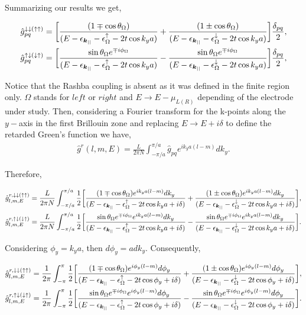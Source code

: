 \documentclass[10pt,prb,showpacs,amssymb,floatfix]{revtex4-1}
\newcommand{\dna}{\downarrow}
\newcommand{\raw}{\rightarrow}
\newcommand{\upa}{\uparrow}
\newcommand{\dlt}{\delta}
\newcommand{\eps}{\epsilon}
\newcommand{\Og}{\Omega}
\begin{document}
Summarizing our results we get,

\begin{align}
\hat{g}^{\dna\dna (\upa\upa)}_{pq} &=\bigg{[}   \frac{(1\mp\cos\theta_\Og)}{(E-\eps_{\bm{k}_{||}}- \eps_\Og^\upa   -2t\cos k_ya)}+ \frac{(1\pm\cos\theta_\Og)}{(E-\eps_{\bm{k}_{||}}- \eps_\Og^\dna   -2t\cos k_ya)} \bigg{]}\frac{\dlt_{pq}}{2},  \\
\hat{g}^{\upa\dna(\dna\upa)}_{pq}  &= \bigg{[}\frac{ \sin\theta_\Og e^{\mp i\phi_\Og}}{ (E-\eps_{\bm{k}_{||}} -\eps_\Og^\upa  -2t\cos k_ya) } - \frac{ \sin\theta_\Og e^{\mp i\phi_\Og}}{(E-\eps_{\bm{k}_{||}} -\eps^\dna_\Og  -2t\cos k_ya)}\bigg{]} \frac{\dlt_{pq}}{2},
\end{align}


Notice that the Rashba coupling is absent as it was defined in the finite region only. $\Og$ stands for $left$ or $right$  and $E \raw E - \mu_{L(R)}$ depending of the electrode under study.  
Then, considering a Fourier transform for the k-points along the $y-$axis in the first Brillouin zone and replacing $E\raw E+i\dlt$ to define the retarded Green's function we have,
\begin{align}
{\hat g}^r(l,m,E)= \frac{L}{2\pi N}\int_{-\pi/a}^{\pi/a}{\hat g}_{pq}e^{ik_ya(l-m)}dk_y.
\end{align}

Therefore,

\begin{align}
\hat{g}^{r, \dna\dna (\upa\upa)}_{l,m,E} &= \frac{L}{2\pi N}\int_{-\pi/a}^{\pi/a} \frac{1}{2} \bigg{[}   \frac{(1\mp\cos\theta_\Og) e^{ik_ya(l-m)}dk_y}{(E-\eps_{\bm{k}_{||}}- \eps_\Og^\upa   -2t\cos k_ya + i\dlt)}+ \frac{(1\pm\cos\theta_\Og) e^{ik_ya(l-m)}dk_y}{(E-\eps_{\bm{k}_{||}}- \eps_\Og^\dna   -2t\cos k_ya + i\dlt)} \bigg{]},  \\
\hat{g}^{r, \upa\dna(\dna\upa)}_{l, m, E}  &=\frac{L}{2\pi N} \int_{-\pi/a}^{\pi/a} \frac{1}{2} \bigg{[}\frac{ \sin\theta_\Og e^{\mp i\phi_\Og} e^{ik_ya(l-m)}dk_y}{ (E-\eps_{\bm{k}_{||}} -\eps_\Og^\upa  -2t\cos k_ya + i\dlt) } - \frac{ \sin\theta_\Og e^{\mp i\phi_\Og} e^{ik_ya(l-m)}dk_y}{(E-\eps_{\bm{k}_{||}} -\eps^\dna_\Og  -2t\cos k_ya + i\dlt)}\bigg{]}.
\end{align}

Considering $\phi_y = k_y a$, then $d\phi_y = a dk_y$. Consequently,

\begin{align}
\hat{g}^{r, \dna\dna (\upa\upa)}_{l,m,E} &= \frac{1}{2\pi}\int_{-\pi}^{\pi} \frac{1}{2} \bigg{[}   \frac{(1\mp\cos\theta_\Og) e^{i\phi_y(l-m)}d\phi_y}{(E-\eps_{\bm{k}_{||}}- \eps_\Og^\upa   -2t\cos \phi_y + i\dlt)}+ \frac{(1\pm\cos\theta_\Og) e^{i\phi_y(l-m)}d\phi_y}{(E-\eps_{\bm{k}_{||}}- \eps_\Og^\dna   -2t\cos \phi_y + i\dlt)} \bigg{]},  \\
\hat{g}^{r, \upa\dna(\dna\upa)}_{l, m, E}  &=\frac{1}{2\pi} \int_{-\pi}^{\pi} \frac{1}{2} \bigg{[}\frac{ \sin\theta_\Og e^{\mp i\phi_\Og} e^{i\phi_y(l-m)}d\phi_y}{ (E-\eps_{\bm{k}_{||}} -\eps_\Og^\upa  -2t\cos \phi_y + i\dlt) } - \frac{ \sin\theta_\Og e^{\mp i\phi_\Og} e^{i\phi_y(l-m)}d\phi_y}{(E-\eps_{\bm{k}_{||}} -\eps^\dna_\Og  -2t\cos \phi_y + i\dlt)}\bigg{]}.
\end{align}
\end{document}
